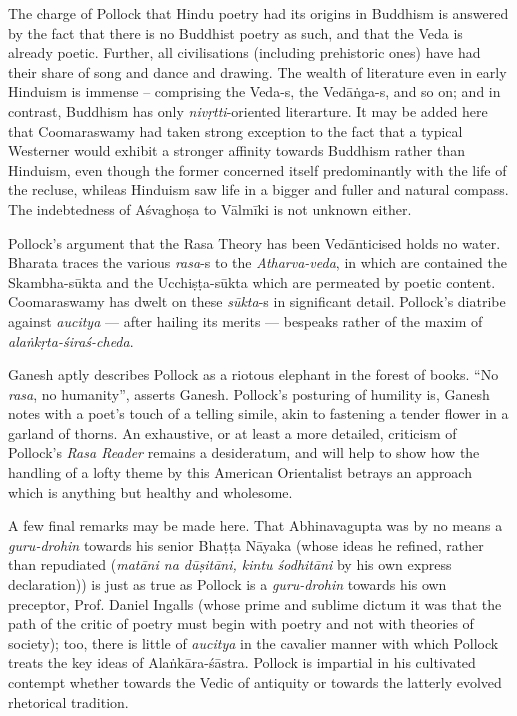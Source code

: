 The charge of Pollock that Hindu poetry had its origins in Buddhism is answered by the fact that there is no Buddhist poetry as such, and that the Veda is already poetic. Further, all civilisations (including prehistoric ones) have had their share of song and dance and drawing. The wealth of literature even in early Hinduism is immense -- comprising the Veda-s, the Vedāṅga-s, and so on; and in contrast, Buddhism has only \textsl{nivṛtti}-oriented literarture. It may be added here that Coomaraswamy had taken strong exception to the fact that a typical Westerner would exhibit a stronger affinity towards Buddhism rather than Hinduism, even though the former concerned itself predominantly with the life of the recluse, whileas Hinduism saw life in a bigger and fuller and natural compass. The indebtedness of Aśvaghoṣa to Vālmīki is not unknown either.

Pollock’s argument that the Rasa Theory has been Vedānticised holds no water. Bharata traces the various \textsl{rasa}-s to the \textsl{Atharva-veda}, in which are contained the Skambha-sūkta and the Ucchiṣṭa-sūkta which are permeated by poetic content. Coomaraswamy has dwelt on these \textsl{sūkta}-s in significant detail. Pollock’s diatribe against \textsl{aucitya} --- after hailing its merits --- bespeaks rather of the maxim of \textsl{alaṅkṛta-śiraś-cheda}.

Ganesh aptly describes Pollock as a riotous elephant in the forest of books. “No \textsl{rasa}, no humanity”, asserts Ganesh. Pollock's posturing of humility is, Ganesh notes with a poet's touch of a telling simile, akin to fastening a tender flower in a garland of thorns. An exhaustive, or at least a more detailed, criticism of Pollock’s \textsl{Rasa Reader} remains a desideratum, and will help to show how the handling of a lofty theme by this American Orientalist betrays an approach which is anything but healthy and wholesome.

A few final remarks may be made here. That Abhinavagupta was by no means a \textsl{guru-drohin} towards his senior Bhaṭṭa Nāyaka (whose ideas he refined, rather than repudiated (\textsl{matāni na dūṣitāni, kintu śodhitāni} by his own express declaration)) is just as true as Pollock is a \textsl{guru-drohin} towards his own preceptor, Prof. Daniel Ingalls (whose prime and sublime dictum it was that the path of the critic of poetry must begin with poetry and not with theories of society); too, there is little of \textsl{aucitya} in the cavalier manner with which Pollock treats the key ideas of Alaṅkāra-śāstra. Pollock is impartial in his cultivated contempt whether towards the Vedic of antiquity or towards the latterly evolved rhetorical tradition.

